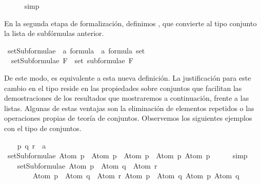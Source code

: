 \begin{isabellebody}
\ \ \ \ \isamarkupfalse%
\ simp%
\endisatagproof
{\isafoldproof}%
%
\isadelimproof
\isanewline
%
\endisadelimproof
{}\isamarkupfalse%
%
\begin{isamarkuptext}%
En la segunda etapa de formalización, definimos 
  , que convierte al tipo conjunto la lista de 
  subfórmulas anterior.%
\end{isamarkuptext}\isamarkuptrue%
\isamarkupfalse%
\ setSubformulae\ {\isacharcolon}{\isacharcolon}\ {\isachardoublequoteopen}{\isacharprime}a\ formula\ {\isasymRightarrow}\ {\isacharprime}a\ formula\ set{\isachardoublequoteclose}\ \isanewline
\ \ {\isachardoublequoteopen}setSubformulae\ F\ {\isasymequiv}\ set\ {\isacharparenleft}subformulae\ F{\isacharparenright}{\isachardoublequoteclose}%
\begin{isamarkuptext}%
De este modo,  es equivalente a esta nueva definición. La 
  justificación para este cambio en el tipo reside en las propiedades 
  sobre conjuntos que facilitan las demostraciones de los resultados que 
  mostraremos a continuación, frente a las listas. Algunas de estas 
  ventajas son la eliminación de elementos repetidos o las operaciones 
  propias de teoría de conjuntos. Observemos los siguientes ejemplos con 
  el tipo de conjuntos.%
\end{isamarkuptext}\isamarkuptrue%
\isamarkupfalse%
\isanewline
{}\isanewline
%
\isadelimproof
\ \ %
\endisadelimproof
%
\isatagproof
{}\isamarkupfalse%
\ p\ q\ r\ {\isacharcolon}{\isacharcolon}\ {\isacharprime}a\isanewline
\isanewline
\ \ \isamarkupfalse%
\ {\isachardoublequoteopen}setSubformulae\ {\isacharparenleft}Atom\ p\ \isactrlbold {\isasymor}\ Atom\ p{\isacharparenright}\ {\isacharequal}\ {\isacharbraceleft}Atom\ p\ \isactrlbold {\isasymor}\ Atom\ p{\isacharcomma}\ Atom\ p{\isacharbraceright}{\isachardoublequoteclose}\isanewline
\ \ \ \ \isamarkupfalse%
\ simp\isanewline
\ \ \isanewline
\ \ \isamarkupfalse%
\ {\isachardoublequoteopen}setSubformulae\ {\isacharparenleft}{\isacharparenleft}Atom\ p\ \isactrlbold {\isasymrightarrow}\ Atom\ q{\isacharparenright}\ \isactrlbold {\isasymor}\ Atom\ r{\isacharparenright}\ {\isacharequal}\isanewline
\ \ \ \ \ \ \ \ {\isacharbraceleft}{\isacharparenleft}Atom\ p\ \isactrlbold {\isasymrightarrow}\ Atom\ q{\isacharparenright}\ \isactrlbold {\isasymor}\ Atom\ r{\isacharcomma}\ Atom\ p\ \isactrlbold {\isasymrightarrow}\ Atom\ q{\isacharcomma}\ Atom\ p{\isacharcomma}\ Atom\ q{\isacharcomma}\ \isanewline

\end{isabellebody}
